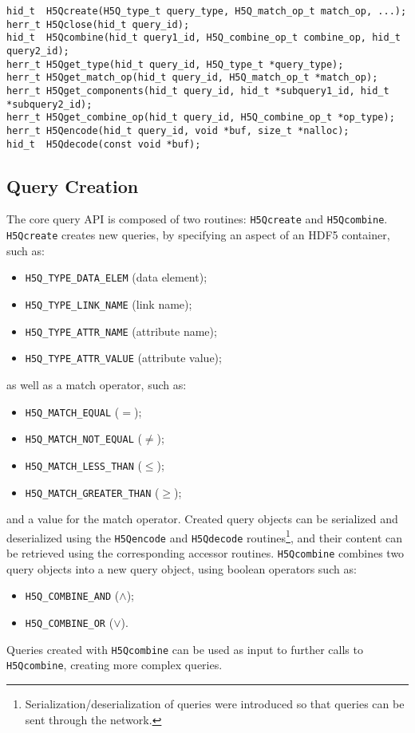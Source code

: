 {
\begin{lstlisting}
hid_t  H5Qcreate(H5Q_type_t query_type, H5Q_match_op_t match_op, ...);
herr_t H5Qclose(hid_t query_id);
hid_t  H5Qcombine(hid_t query1_id, H5Q_combine_op_t combine_op, hid_t query2_id);
herr_t H5Qget_type(hid_t query_id, H5Q_type_t *query_type);
herr_t H5Qget_match_op(hid_t query_id, H5Q_match_op_t *match_op);
herr_t H5Qget_components(hid_t query_id, hid_t *subquery1_id, hid_t *subquery2_id);
herr_t H5Qget_combine_op(hid_t query_id, H5Q_combine_op_t *op_type);
herr_t H5Qencode(hid_t query_id, void *buf, size_t *nalloc);
hid_t  H5Qdecode(const void *buf);
\end{lstlisting}
}

\subsection{Query Creation}

The core query API is composed of
two routines: \texttt{H5Qcreate} and \texttt{H5Qcombine}. \texttt{H5Qcreate}
creates new queries, by specifying an aspect of an HDF5 container, such as:
\begin{itemize}
\item \texttt{H5Q\_TYPE\_DATA\_ELEM} (data element);
\item \texttt{H5Q\_TYPE\_LINK\_NAME} (link name);
\item \texttt{H5Q\_TYPE\_ATTR\_NAME} (attribute name);
\item \texttt{H5Q\_TYPE\_ATTR\_VALUE} (attribute value);
\end{itemize}
as well as a match operator, such as:
\begin{itemize}
\item \texttt{H5Q\_MATCH\_EQUAL} ($=$);
\item \texttt{H5Q\_MATCH\_NOT\_EQUAL} ($\neq$);
\item \texttt{H5Q\_MATCH\_LESS\_THAN} ($\leq$);
\item \texttt{H5Q\_MATCH\_GREATER\_THAN} ($\geq$);
\end{itemize}
and a value for the match operator.
Created query objects can be serialized and deserialized using the \texttt{H5Qencode}
and \texttt{H5Qdecode} routines\footnote{Serialization/deserialization of queries
were introduced so that queries can be sent through the network.}, and their
content can be retrieved using the corresponding accessor routines.
\texttt{H5Qcombine} combines two query objects into a
new query object, using boolean operators such as:
\begin{itemize}
\item \texttt{H5Q\_COMBINE\_AND} ($\mathrm{\land}$);
\item \texttt{H5Q\_COMBINE\_OR} ($\mathrm{\lor}$).
\end{itemize}
Queries created with \texttt{H5Qcombine} can be used as input to further
calls to \texttt{H5Qcombine}, creating more complex queries.

